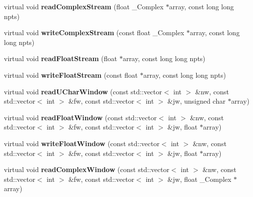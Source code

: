 \begin{DoxyCompactItemize}
virtual void {\bfseries read\+Complex\+Stream} (float \+\_\+\+Complex $\ast$array, const long long npts)
\item 
\mbox{\label{class_s_e_p_1_1sep_reg_file_a29a6b16f67124419dbf21ca56e50fec7}} 
virtual void {\bfseries write\+Complex\+Stream} (const float \+\_\+\+Complex $\ast$array, const long long npts)
\item 
\mbox{\label{class_s_e_p_1_1sep_reg_file_a30eaa78566ac2f9d0c4c3e49975c1e82}} 
virtual void {\bfseries read\+Float\+Stream} (float $\ast$array, const long long npts)
\item 
\mbox{\label{class_s_e_p_1_1sep_reg_file_ab1405dfbba6df7cae8513f24c899994d}} 
virtual void {\bfseries write\+Float\+Stream} (const float $\ast$array, const long long npts)
\item 
\mbox{\label{class_s_e_p_1_1sep_reg_file_a75af575c5ab6637486afcb5360c8af96}} 
virtual void {\bfseries read\+U\+Char\+Window} (const std\+::vector$<$ int $>$ \&nw, const std\+::vector$<$ int $>$ \&fw, const std\+::vector$<$ int $>$ \&jw, unsigned char $\ast$array)
\item 
\mbox{\label{class_s_e_p_1_1sep_reg_file_a24c74a1ef7690af9fe66ddd953bf680c}} 
virtual void {\bfseries read\+Float\+Window} (const std\+::vector$<$ int $>$ \&nw, const std\+::vector$<$ int $>$ \&fw, const std\+::vector$<$ int $>$ \&jw, float $\ast$array)
\item 
\mbox{\label{class_s_e_p_1_1sep_reg_file_afced1df11bbdf8853edeb5588d3e1ac0}} 
virtual void {\bfseries write\+Float\+Window} (const std\+::vector$<$ int $>$ \&nw, const std\+::vector$<$ int $>$ \&fw, const std\+::vector$<$ int $>$ \&jw, float $\ast$array)
\item 
\mbox{\label{class_s_e_p_1_1sep_reg_file_a9df2ff32f2f81f9a5ee5793532d39686}} 
virtual void {\bfseries read\+Complex\+Window} (const std\+::vector$<$ int $>$ \&nw, const std\+::vector$<$ int $>$ \&fw, const std\+::vector$<$ int $>$ \&jw, float \+\_\+\+Complex $\ast$array)
\item 
\mbox{\label{class_s_e_p_1_1sep_reg_file_a6b3cfc249563307af3e4090f86e53352}} 

\end{DoxyCompactItemize}
